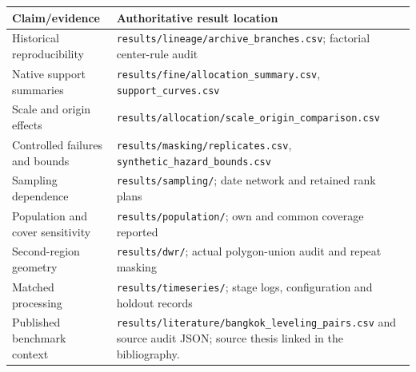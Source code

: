\documentclass[10pt,a4paper]{article}
\begin{document}
\begin{tabular}{p{.22\linewidth}p{.69\linewidth}}\toprule
Claim/evidence & Authoritative result location\\\midrule
Historical reproducibility & \texttt{results/lineage/archive\_branches.csv}; factorial center-rule audit\\
Native support summaries & \texttt{results/fine/allocation\_summary.csv}, \texttt{support\_curves.csv}\\
Scale and origin effects & \texttt{results/allocation/scale\_origin\_comparison.csv}\\
Controlled failures and bounds & \texttt{results/masking/replicates.csv}, \texttt{synthetic\_hazard\_bounds.csv}\\
Sampling dependence & \texttt{results/sampling/}; date network and retained rank plans\\
Population and cover sensitivity & \texttt{results/population/}; own and common coverage reported\\
Second-region geometry & \texttt{results/dwr/}; actual polygon-union audit and repeat masking\\
Matched processing & \texttt{results/timeseries/}; stage logs, configuration and holdout records\\
Published benchmark context & \texttt{results/literature/bangkok\_leveling\_pairs.csv} and source audit JSON; source thesis linked in the bibliography.\\\bottomrule
\end{tabular}
\end{document}
